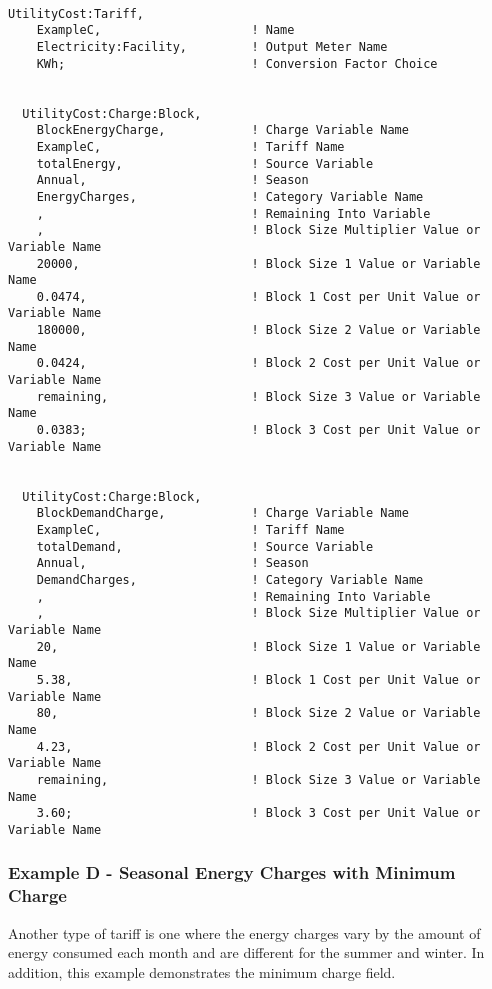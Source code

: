 \begin{lstlisting}

UtilityCost:Tariff,
    ExampleC,                     ! Name
    Electricity:Facility,         ! Output Meter Name
    KWh;                          ! Conversion Factor Choice


  UtilityCost:Charge:Block,
    BlockEnergyCharge,            ! Charge Variable Name
    ExampleC,                     ! Tariff Name
    totalEnergy,                  ! Source Variable
    Annual,                       ! Season
    EnergyCharges,                ! Category Variable Name
    ,                             ! Remaining Into Variable
    ,                             ! Block Size Multiplier Value or Variable Name
    20000,                        ! Block Size 1 Value or Variable Name
    0.0474,                       ! Block 1 Cost per Unit Value or Variable Name
    180000,                       ! Block Size 2 Value or Variable Name
    0.0424,                       ! Block 2 Cost per Unit Value or Variable Name
    remaining,                    ! Block Size 3 Value or Variable Name
    0.0383;                       ! Block 3 Cost per Unit Value or Variable Name


  UtilityCost:Charge:Block,
    BlockDemandCharge,            ! Charge Variable Name
    ExampleC,                     ! Tariff Name
    totalDemand,                  ! Source Variable
    Annual,                       ! Season
    DemandCharges,                ! Category Variable Name
    ,                             ! Remaining Into Variable
    ,                             ! Block Size Multiplier Value or Variable Name
    20,                           ! Block Size 1 Value or Variable Name
    5.38,                         ! Block 1 Cost per Unit Value or Variable Name
    80,                           ! Block Size 2 Value or Variable Name
    4.23,                         ! Block 2 Cost per Unit Value or Variable Name
    remaining,                    ! Block Size 3 Value or Variable Name
    3.60;                         ! Block 3 Cost per Unit Value or Variable Name
\end{lstlisting}

\subsubsection{Example D - Seasonal Energy Charges with Minimum Charge}\label{example-d---seasonal-energy-charges-with-minimum-charge}

Another type of tariff is one where the energy charges vary by the amount of energy consumed each month and are different for the summer and winter. In addition, this example demonstrates the minimum charge field.

